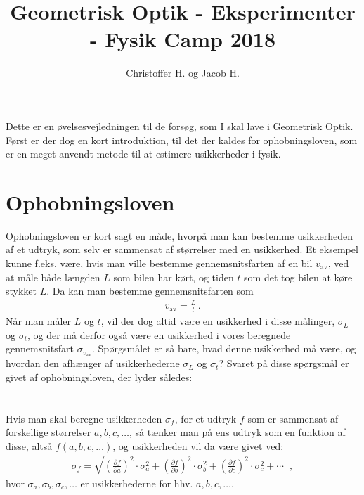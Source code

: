 \documentclass[a4paper,oneside,article,11pt]{memoir}
\begin{document}
\title{Geometrisk Optik - Eksperimenter - Fysik Camp 2018}

\author{Christoffer H. og Jacob H.}

\maketitle
Dette er en øvelsesvejledningen til de forsøg, som I skal lave i Geometrisk Optik. Først er der dog en kort introduktion, til det der kaldes for ophobningsloven, som er en meget anvendt metode til at estimere usikkerheder i fysik.\\ 

\section*{Ophobningsloven}
Ophobningsloven er kort sagt en måde, hvorpå man kan bestemme usikkerheden af et udtryk, som selv er sammensat af størrelser med en usikkerhed. Et eksempel kunne f.eks. være, hvis man ville bestemme gennemsnitsfarten af en bil $v_{\text{av}}$, ved at måle både længden $L$ som bilen har kørt, og tiden $t$ som det tog bilen at køre stykket $L$. Da kan man bestemme gennemsnitsfarten som
\begin{align*}
v_{\text{av}} = \frac{L}{t} \, .
\end{align*}
Når man måler $L$ og $t$, vil der dog altid være en usikkerhed i disse målinger, $\sigma_L$ og $\sigma_t$, og der må derfor også være en usikkerhed i vores beregnede gennemsnitsfart $\sigma_{v_\text{av}}$. Spørgsmålet er så bare, hvad denne usikkerhed må være, og hvordan den afhænger af usikkerhederne $\sigma_L$ og $\sigma_t$? Svaret på disse spørgsmål er givet af ophobningsloven, der lyder således:\\ \\ \\

Hvis man skal beregne usikkerheden $\sigma_f$, for et udtryk $f$ som er sammensat af forskellige størrelser $a,b,c,\ldots$, så tænker man på ens udtryk som en funktion af disse, altså $f(a,b,c,\ldots)$, og usikkerheden vil da være givet ved:
\begin{align*}
\sigma_f = \sqrt{\left(\frac{\partial f}{\partial a}\right)^2 \cdot \sigma_a^2 + \left(\frac{\partial f}{\partial b}\right)^2 \cdot \sigma_b^2 + \left(\frac{\partial f}{\partial c}\right)^2 \cdot \sigma_c^2 + \cdots} \, \, \, ,
\end{align*}
hvor $\sigma_a,\sigma_b,\sigma_c,\ldots$ er usikkerhederne for hhv. $a,b,c,\ldots$. \\ \\ \\
\end{document}
